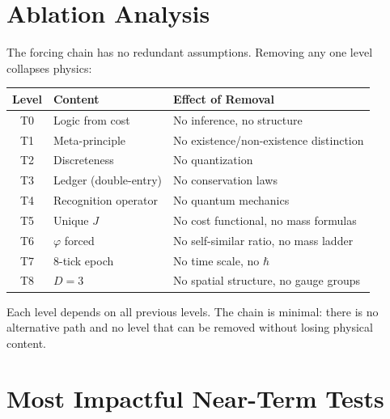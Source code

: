 \documentclass[12pt,a4paper]{article}
\theoremstyle{definition}
\theoremstyle{remark}
\begin{document}
\section{Ablation Analysis}
\label{sec:ablation}

The forcing chain has no redundant assumptions.  Removing any one level
collapses physics:

\begin{center}
\renewcommand{\arraystretch}{1.15}
\begin{tabular}{clp{8cm}}
\toprule
\textbf{Level} & \textbf{Content} & \textbf{Effect of Removal} \\
\midrule
T0 & Logic from cost & No inference, no structure \\
T1 & Meta-principle & No existence/non-existence distinction \\
T2 & Discreteness & No quantization \\
T3 & Ledger (double-entry) & No conservation laws \\
T4 & Recognition operator & No quantum mechanics \\
T5 & Unique $J$ & No cost functional, no mass formulas \\
T6 & $\varphi$ forced & No self-similar ratio, no mass ladder \\
T7 & 8-tick epoch & No time scale, no $\hbar$ \\
T8 & $D = 3$ & No spatial structure, no gauge groups \\
\bottomrule
\end{tabular}
\end{center}

Each level depends on all previous levels.  The chain is minimal:
there is no alternative path and no level that can be removed without
losing physical content.

\section{Most Impactful Near-Term Tests}
\label{sec:tests}
\end{document}
